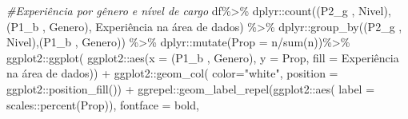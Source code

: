 \documentclass[
]{article}
\newenvironment{Shaded}{\begin{snugshade}}{\end{snugshade}}
\newcommand{\AttributeTok}[1]{\textcolor[rgb]{0.77,0.63,0.00}{#1}}
\newcommand{\CommentTok}[1]{\textcolor[rgb]{0.56,0.35,0.01}{\textit{#1}}}
\newcommand{\FunctionTok}[1]{\textcolor[rgb]{0.00,0.00,0.00}{#1}}
\newcommand{\NormalTok}[1]{#1}
\newcommand{\SpecialCharTok}[1]{\textcolor[rgb]{0.00,0.00,0.00}{#1}}
\newcommand{\StringTok}[1]{\textcolor[rgb]{0.31,0.60,0.02}{#1}}
\begin{document}
\begin{Shaded}
\begin{Highlighting}[]
\CommentTok{\#Experiência por gênero e nível de cargo}
\NormalTok{df}\SpecialCharTok{\%\textgreater{}\%}
\NormalTok{  dplyr}\SpecialCharTok{::}\FunctionTok{count}\NormalTok{(}\StringTok{\textasciigrave{}}\AttributeTok{(\textquotesingle{}P2\_g \textquotesingle{}, \textquotesingle{}Nivel\textquotesingle{})}\StringTok{\textasciigrave{}}\NormalTok{,}\StringTok{\textasciigrave{}}\AttributeTok{(\textquotesingle{}P1\_b \textquotesingle{}, \textquotesingle{}Genero\textquotesingle{})}\StringTok{\textasciigrave{}}\NormalTok{,}
               \StringTok{\textasciigrave{}}\AttributeTok{Experiência na área de dados}\StringTok{\textasciigrave{}}\NormalTok{) }\SpecialCharTok{\%\textgreater{}\%}
\NormalTok{  dplyr}\SpecialCharTok{::}\FunctionTok{group\_by}\NormalTok{(}\StringTok{\textasciigrave{}}\AttributeTok{(\textquotesingle{}P2\_g \textquotesingle{}, \textquotesingle{}Nivel\textquotesingle{})}\StringTok{\textasciigrave{}}\NormalTok{,}\StringTok{\textasciigrave{}}\AttributeTok{(\textquotesingle{}P1\_b \textquotesingle{}, \textquotesingle{}Genero\textquotesingle{})}\StringTok{\textasciigrave{}}\NormalTok{) }\SpecialCharTok{\%\textgreater{}\%}
\NormalTok{  dplyr}\SpecialCharTok{::}\FunctionTok{mutate}\NormalTok{(}\AttributeTok{Prop =}\NormalTok{ n}\SpecialCharTok{/}\FunctionTok{sum}\NormalTok{(n))}\SpecialCharTok{\%\textgreater{}\%}
\NormalTok{  ggplot2}\SpecialCharTok{::}\FunctionTok{ggplot}\NormalTok{(}
\NormalTok{    ggplot2}\SpecialCharTok{::}\FunctionTok{aes}\NormalTok{(}\AttributeTok{x =} \StringTok{\textasciigrave{}}\AttributeTok{(\textquotesingle{}P1\_b \textquotesingle{}, \textquotesingle{}Genero\textquotesingle{})}\StringTok{\textasciigrave{}}\NormalTok{, }\AttributeTok{y =}\NormalTok{ Prop,}
                 \AttributeTok{fill =} \StringTok{\textasciigrave{}}\AttributeTok{Experiência na área de dados}\StringTok{\textasciigrave{}}\NormalTok{)) }\SpecialCharTok{+}
\NormalTok{  ggplot2}\SpecialCharTok{::}\FunctionTok{geom\_col}\NormalTok{( }\AttributeTok{color=}\StringTok{"white"}\NormalTok{,}
                     \AttributeTok{position =}\NormalTok{ ggplot2}\SpecialCharTok{::}\FunctionTok{position\_fill}\NormalTok{()) }\SpecialCharTok{+}
\NormalTok{  ggrepel}\SpecialCharTok{::}\FunctionTok{geom\_label\_repel}\NormalTok{(ggplot2}\SpecialCharTok{::}\FunctionTok{aes}\NormalTok{(}
    \AttributeTok{label =}\NormalTok{ scales}\SpecialCharTok{::}\FunctionTok{percent}\NormalTok{(Prop)),}
    \AttributeTok{fontface =} \StringTok{\textquotesingle{}bold\textquotesingle{}}\NormalTok{,}

\end{Highlighting}
\end{Shaded}
\end{document}
